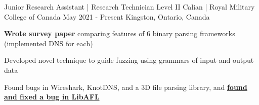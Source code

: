 \begin{cventries}
  \cventry
    {Junior Research Assistant | Research Technician Level II} %
    {Calian | Royal Military College of Canada} %
    {May 2021 - Present} %
    {Kingston, Ontario, Canada} %
    {
      \begin{cvitems} %
        \item{\textbf{Wrote survey paper} comparing features of 6 binary parsing frameworks (implemented DNS for each)}
        \item{Developed novel technique to guide fuzzing using grammars of input and output data}
        \item{Found bugs in Wireshark, KnotDNS, and a 3D file parsing library, and \textbf{\href{https://github.com/AFLplusplus/LibAFL/pull/1317}{found and fixed a bug in LibAFL}}}
      \end{cvitems}
    }


\end{cventries}
